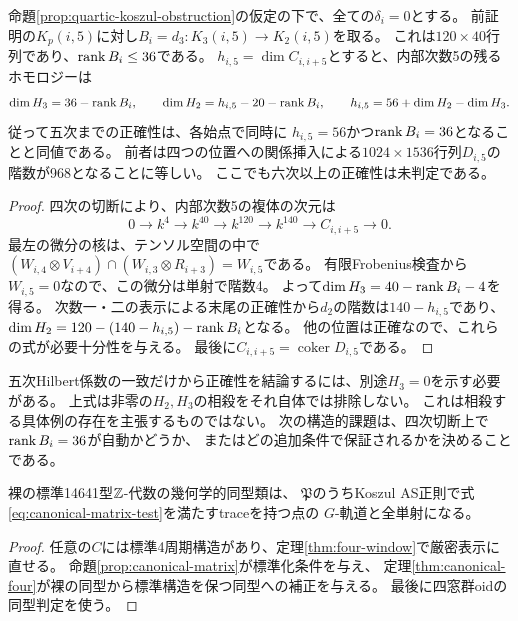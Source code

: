 \begin{proposition}[五次で必要な二つの階数]\label{prop:quintic-koszul-obstruction}
命題\ref{prop:quartic-koszul-obstruction}の仮定の下で、全ての$\delta_i=0$とする。
前証明の$K_p(i,5)$に対し$B_i=d_3:K_3(i,5)\to K_2(i,5)$を取る。
これは$120\times40$行列であり、$\operatorname{rank} B_i\leq36$である。
$h_{i,5}=\dim C_{i,i+5}$とすると、内部次数5の残るホモロジーは
\[
 \dim H_3=36-\operatorname{rank} B_i,\qquad
 \dim H_2=h_{i,5}-20-\operatorname{rank} B_i,
 \qquad h_{i,5}=56+\dim H_2-\dim H_3.
\]
従って五次までの正確性は、各始点で同時に
$h_{i,5}=56$かつ$\operatorname{rank} B_i=36$となることと同値である。
前者は四つの位置への関係挿入による$1024\times1536$行列$D_{i,5}$の
階数が968となることに等しい。
ここでも六次以上の正確性は未判定である。
\end{proposition}
\begin{proof}
四次の切断により、内部次数5の複体の次元は
\[
 0\longrightarrow k^4\longrightarrow k^{40}\longrightarrow k^{120}
 \longrightarrow k^{140}\longrightarrow C_{i,i+5}\longrightarrow0.
\]
最左の微分の核は、テンソル空間の中で
$(W_{i,4}\otimes V_{i+4})\cap(W_{i,3}\otimes R_{i+3})=W_{i,5}$である。
有限Frobenius検査から$W_{i,5}=0$なので、この微分は単射で階数4。
よって$\dim H_3=40-\operatorname{rank} B_i-4$を得る。
次数一・二の表示による末尾の正確性から$d_2$の階数は$140-h_{i,5}$であり、
$\dim H_2=120-(140-h_{i,5})-\operatorname{rank} B_i$となる。
他の位置は正確なので、これらの式が必要十分性を与える。
最後に$C_{i,i+5}=\operatorname{coker}D_{i,5}$である。
\end{proof}
\begin{remark}
五次Hilbert係数の一致だけから正確性を結論するには、別途$H_3=0$を示す必要がある。
上式は非零の$H_2,H_3$の相殺をそれ自体では排除しない。
これは相殺する具体例の存在を主張するものではない。
次の構造的課題は、四次切断上で$\operatorname{rank} B_i=36$が自動かどうか、
またはどの追加条件で保証されるかを決めることである。
\end{remark}

\begin{corollary}\label{cor:canonical-slice}
裸の標準14641型$\mathbb Z$-代数の幾何学的同型類は、
$\mathfrak P$のうちKoszul AS正則で式\eqref{eq:canonical-matrix-test}を満たすtraceを持つ点の
$G$-軌道と全単射になる。
\end{corollary}
\begin{proof}
任意の$C$には標準4周期構造があり、定理\ref{thm:four-window}で厳密表示に直せる。
命題\ref{prop:canonical-matrix}が標準化条件を与え、
定理\ref{thm:canonical-four}が裸の同型から標準構造を保つ同型への補正を与える。
最後に四窓群oidの同型判定を使う。
\end{proof}

